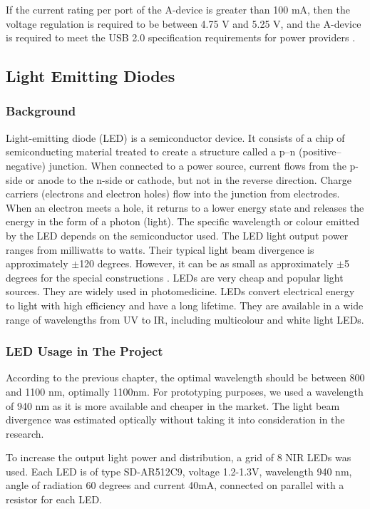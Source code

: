 If the current rating per port of the A-device is greater than 100 mA, then the voltage regulation is required to be between 4.75 V and 5.25 V, and the A-device is required to meet the USB 2.0 specification requirements for power providers \parencite{otg}.


\subsection{Light Emitting Diodes}
\subsubsection{Background}
Light-emitting diode (LED) is a semiconductor device. It consists of a chip of semiconducting material treated to create a structure called a p–n (positive–negative) junction. When connected to a power source, current flows from the p-side or anode to the n-side or cathode, but not in the reverse direction. Charge carriers (electrons and electron holes) flow into the junction from electrodes. When an electron meets a hole, it returns to a lower energy state and releases the energy in the form of a photon (light)\parencite{led}. The specific wavelength or colour emitted by the LED depends on the semiconductor used. The LED light output power ranges from milliwatts to watts. Their typical light beam divergence is approximately $\pm$120 degrees. However, it can be as small as approximately $\pm$5 degrees for the special constructions \parencite{led}. LEDs are very cheap and popular light sources. They are widely used in photomedicine. LEDs convert electrical energy to light with high efficiency and have a long lifetime. They are available in a wide range of wavelengths from UV to IR, including multicolour and white light LEDs. 

\subsubsection{LED Usage in The Project}

According to the previous chapter, the optimal wavelength should be between 800 and 1100 nm, optimally 1100nm. For prototyping purposes, we used a wavelength of 940 nm as it is more available and cheaper in the market. The light beam divergence was estimated optically without taking it into consideration in the research.

To increase the output light power and distribution, a grid of 8 NIR LEDs was used. Each LED is of type SD-AR512C9, voltage 1.2-1.3V, wavelength 940 nm, angle of radiation 60 degrees and current 40mA, connected on parallel with a resistor for each LED. 

